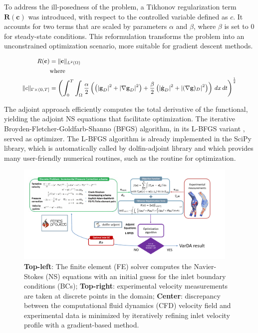 To address the ill-posedness of the problem, a Tikhonov regularization term $\textbf{R}(\textbf{c})$ was introduced, with respect to the controlled variable defined as $c$. It accounts for two terms that are scaled by parameters \(\alpha\) and \(\beta\), where \(\beta\) is set to $0$ for steady-state conditions. This reformulation transforms the problem into an unconstrained optimization scenario, more suitable for gradient descent methods. 

\begin{equation}
\small
    \begin{aligned}
        R(\mathbf{c}) &= \| \mathbf{c} \|_{L^2(\Omega)} \\
        &\text{where} \\
        \small
        \|c\|_{\Gamma \times (0, T]} &= \left( \int_0^T \int_{\Omega} \frac{\alpha}{2} \left( \left(|\textbf{g}_D|^2 + |\nabla \textbf{g}_D|^2 \right) + \frac{\beta}{2} \left( |\dot{\textbf{g}}_D|^2 +  |(\nabla \textbf{g})_D|^2 \right) \right) \, dx \, dt \right)^{\frac{1}{2}}
    \end{aligned}
    \label{eq:12} 
\end{equation}

The adjoint approach efficiently computes the total derivative of the functional, yielding the adjoint NS equations that facilitate optimization. The iterative Broyden-Fletcher-Goldfarb-Shanno (BFGS) algorithm, in its L-BFGS variant \citep{Liu1989}, served as optimizer. The L-BFGS algorithm is already implemented in the SciPy library, which is automatically
called by dolfin-adjoint library and which provides many user-friendly numerical routines, such as the routine for optimization.


\begin{figure}
    \centering
    \includegraphics[width=0.95\textwidth]{chapters/paratico/Fig1.1.pdf}
    \caption{\small \textbf{Top-left}: The finite element (FE) solver computes the Navier-Stokes (NS) equations with an initial guess for the inlet boundary conditions (BCs); \textbf{Top-right}: experimental velocity measurements are taken at discrete points in the domain; \textbf{Center}: discrepancy between the computational fluid dynamics (CFD) velocity field and experimental data is minimized by iteratively refining inlet velocity profile with a gradient-based method.}
    \label{fig:scheme}
\end{figure}

